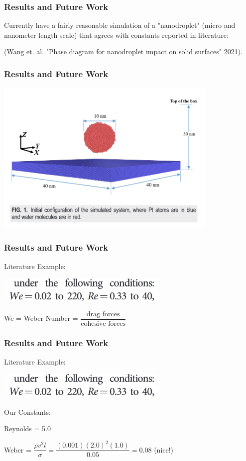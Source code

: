 \documentclass[12pt]{beamer}
\begin{document}
\begin{frame}
    \frametitle{Results and Future Work}
    Currently have a fairly reasonable simulation of a "nanodroplet" (micro and
    nanometer length scale) that agrees with constants reported in literature:
    
    (Wang et. al. "Phase diagram for nanodroplet impact on solid surfaces" 2021).
\end{frame}
\begin{frame}
    \frametitle{Results and Future Work}
    \includegraphics[width=0.8\textwidth]{img/wang-3d.png}
\end{frame}
\begin{frame}
    \frametitle{Results and Future Work}
    Literature Example:

    \
    \includegraphics[width=0.6\textwidth]{img/wang-constants.png}

    We = Weber Number = $\dfrac{\text{drag forces}}{\text{cohesive forces}}$
\end{frame}
\begin{frame}
    \frametitle{Results and Future Work}
    Literature Example:

    \
    \includegraphics[width=0.6\textwidth]{img/wang-constants.png}

    Our Constants:

    Reynolds = 5.0

    Weber = $\dfrac{\rho v^2 l}{\sigma} 
    = \dfrac{(0.001)(2.0)^2(1.0)}{0.05}
    = 0.08$ (nice!)
\end{frame}
\end{document}
